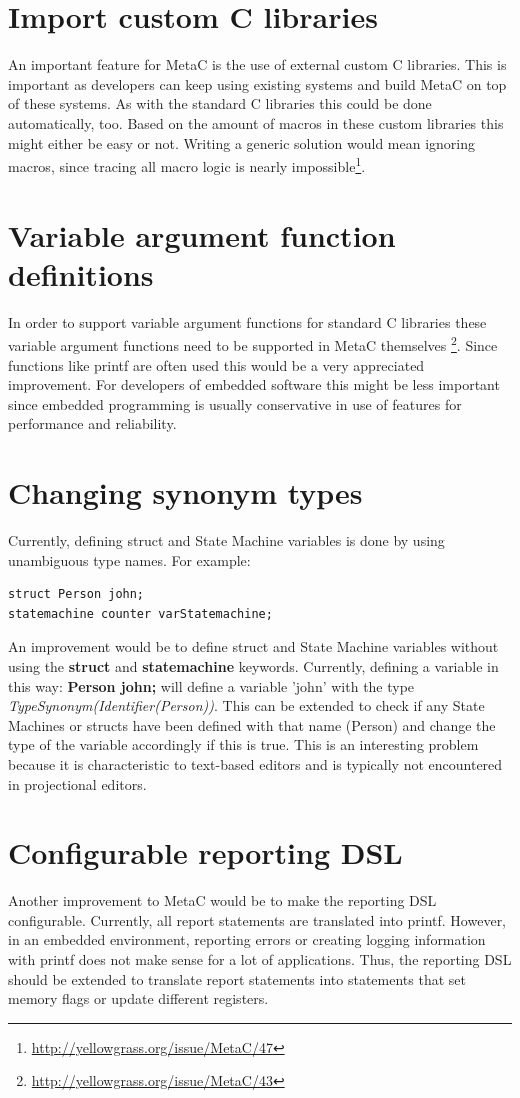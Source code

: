 \documentclass[a4paper,10pt,titlepage]{report}
\begin{document}
\section{Import custom C libraries}
An important feature for MetaC is the use of external custom C libraries. This is important as developers can keep using existing systems and build MetaC on top of these systems. As with the standard C libraries this could be done automatically, too. Based on the amount of macros in these custom libraries this might either be easy or not. Writing a generic solution would mean ignoring macros, since tracing all macro logic is nearly impossible\footnote{\url{http://yellowgrass.org/issue/MetaC/47}}.

\section{Variable argument function definitions}
In order to support variable argument functions for standard C libraries these variable argument functions need to be supported in MetaC themselves \footnote{\url{http://yellowgrass.org/issue/MetaC/43}}. Since functions like printf are often used this would be a very appreciated improvement. For developers of embedded software this might be less important since embedded programming is usually conservative in use of features for performance and reliability.

\section{Changing synonym types}
Currently, defining struct and State Machine variables is done by using unambiguous type names. For example:
\begin{lstlisting}
struct Person john;
statemachine counter varStatemachine;
\end{lstlisting}
An improvement would be to define struct and State Machine variables without using the \textbf{struct} and \textbf{statemachine} keywords. Currently, defining a variable in this way: \textbf{Person john;} will define a variable 'john' with the type \emph{TypeSynonym(Identifier(Person))}. This can be extended to check if any State Machines or structs have been defined with that name (Person) and change the type of the variable accordingly if this is true. This is an interesting problem because it is characteristic to text-based editors and is typically not encountered in projectional editors.

\section{Configurable reporting DSL}
Another improvement to MetaC would be to make the reporting DSL configurable. Currently, all report statements are translated into printf. However, in an embedded environment, reporting errors or creating logging information with printf does not make sense for a lot of applications. Thus, the reporting DSL should be extended to translate report statements into statements that set memory flags or update  different registers.
\end{document}

